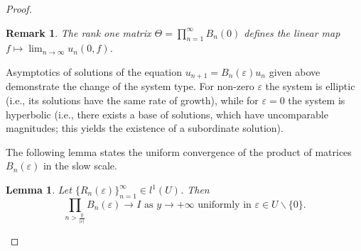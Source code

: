 \documentclass[a4paper,oneside,12pt]{amsart}
\newtheorem{lem}{Lemma}
\newtheorem{rem}{Remark}
\begin{document}
\begin{proof}
    \begin{rem}\label{rem about Theta}
    The rank one matrix $\Theta=\prod_{n=1}^{\infty}B_n(0)$ defines the linear map \linebreak $f\mapsto\lim_{n\rightarrow\infty}u_n(0,f)$.
    \end{rem}

Asymptotics of solutions of the equation $u_{n+1}=B_n(\varepsilon)u_n$ given above
demonstrate the change of the system type. For non-zero $\varepsilon$ the system is elliptic (i.e., its solutions have the same rate of growth), while for $\varepsilon=0$ the system is hyperbolic (i.e., there exists a base of solutions, which have uncomparable magnitudes; this yields the existence of a subordinate solution).

The following lemma states the uniform convergence of the product of matrices $B_n(\varepsilon)$ in the slow scale.

    \begin{lem}\label{lem convergence of the tail}
    Let $\{R_n(\varepsilon)\}_{n=1}^{\infty}\in l^1(U)$. Then
    \begin{equation*}
        \prod_{n>\frac y{|\varepsilon|}}B_n(\varepsilon)\rightarrow I\text{ as }y\rightarrow+\infty\text{ uniformly in }\varepsilon\in U\backslash\{0\}.
    \end{equation*}
    \end{lem}


\end{proof}
\end{document}
